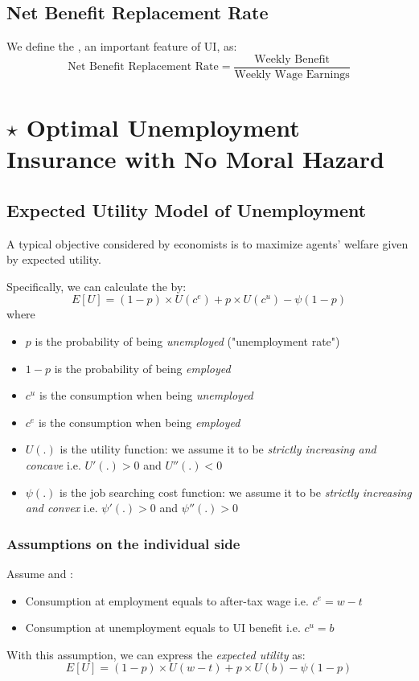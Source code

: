     \subsection{Net Benefit Replacement Rate}
        We define the , an important feature of UI, as:
        $$\text{Net\ Benefit\ Replacement\ Rate} = \frac{\text{Weekly\ Benefit}}{\text{Weekly\ Wage\ Earnings}}$$
        
\section{$\star$ Optimal Unemployment Insurance with No Moral Hazard}

    \subsection{Expected Utility Model of Unemployment}
        A typical objective considered by economists is to maximize agents' welfare given by expected utility.
        
        Specifically, we can calculate the  by:
        $$E[U] = (1-p)\times{U(c^e)} + p\times{U(c^u)} - \psi(1-p)$$
        where
        \begin{itemize}
            \item $p$ is the probability of being \emph{unemployed} ("unemployment rate")
            \item $1-p$ is the probability of being \emph{employed}
            \item $c^u$ is the consumption when being \emph{unemployed}
            \item $c^e$ is the consumption when being \emph{employed}
            \item $U(.)$ is the utility function: we assume it to be \emph{strictly increasing and concave} i.e. $U'(.)>0$ and $U''(.)<0$
            \item $\psi(.)$ is the job searching cost function: we assume it to be \emph{strictly increasing and convex} i.e. $\psi'(.)>0$ and $\psi''(.)>0$
        \end{itemize}
        
            \subsubsection{Assumptions on the individual side}
                Assume  and :
                \begin{itemize}
                    \item Consumption at employment equals to after-tax wage i.e. $c^e = w-t$
                    \item Consumption at unemployment equals to UI benefit i.e. $c^u = b$
                \end{itemize}
                With this assumption, we can express the \emph{expected utility} as:
                \begin{equation}
                    E[U] = (1-p)\times{U(w-t)} + p\times{U(b)} - \psi(1-p)
                    \label{eqn:ui_exp_utility}
                \end{equation}
                
